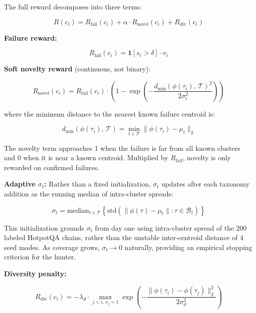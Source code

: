 \documentclass[11pt,a4paper]{article}
\begin{document}
The full reward decomposes into three terms:

\begin{equation}
R(c_i) = R_\text{fail}(c_i) + \alpha \cdot R_\text{novel}(c_i) + R_\text{div}(c_i)
\label{eq:reward}
\end{equation}

\textbf{Failure reward:}

\begin{equation}
R_\text{fail}(c_i) = \mathbf{1}[s_i > \delta] \cdot v_i
\label{eq:rfail}
\end{equation}

\textbf{Soft novelty reward} (continuous, not binary):

\begin{equation}
R_\text{novel}(c_i) = R_\text{fail}(c_i) \cdot
\left(1 - \exp\!\left(-\frac{d_\text{min}(\phi(\tau_i),\, \mathcal{T})^2}
{2\sigma_t^2}\right)\right)
\label{eq:rnovel}
\end{equation}

where the minimum distance to the nearest known failure centroid is:

$$d_\text{min}(\phi(\tau_i),\, \mathcal{T}) =
\min_{t \in \mathcal{T}} \|\phi(\tau_i) - \mu_t\|_2$$

The novelty term approaches 1 when the failure is far from all known clusters
and 0 when it is near a known centroid. Multiplied by $R_\text{fail}$, novelty
is only rewarded on confirmed failures.

\textbf{Adaptive $\sigma_t$:} Rather than a fixed initialization, $\sigma_t$
updates after each taxonomy addition as the running median of intra-cluster
spreads:

\begin{equation}
\sigma_t = \text{median}_{t \in \mathcal{T}}\left\{
\text{std}\left(\|\phi(\tau) - \mu_t\| : \tau \in \mathcal{B}_t\right)
\right\}
\label{eq:sigma}
\end{equation}

This initialization grounds $\sigma_t$ from day one using intra-cluster spread
of the 200 labeled HotpotQA chains, rather than the unstable inter-centroid
distance of 4 seed modes. As coverage grows, $\sigma_t \to 0$ naturally,
providing an empirical stopping criterion for the hunter.

\textbf{Diversity penalty:}

\begin{equation}
R_\text{div}(c_i) = -\lambda_d \cdot
\max_{j < i,\, v_j=1}
\exp\!\left(-\frac{\|\phi(\tau_i) - \phi(\tau_j)\|_2^2}{2\sigma_d^2}\right)
\label{eq:rdiv}
\end{equation}
\end{document}
